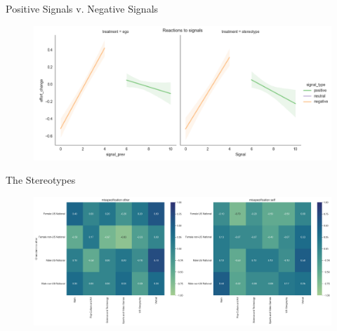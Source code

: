\documentclass[aspectratio=169]{beamer}
\begin{document}
\begin{frame}{Positive Signals v. Negative Signals}
    \label{positivevnegative}
    \begin{figure}
        \centering
        \includegraphics[scale=.5]{signalvalue_effort_change.png}
    \end{figure}

\end{frame}


\begin{frame}{The Stereotypes}
    \label{stereotypes}
    \begin{figure}
        \centering
        \includegraphics[scale=.3]{misspecifications_characteristics_treatment.png}
    \end{figure}


\end{frame}
\end{document}
